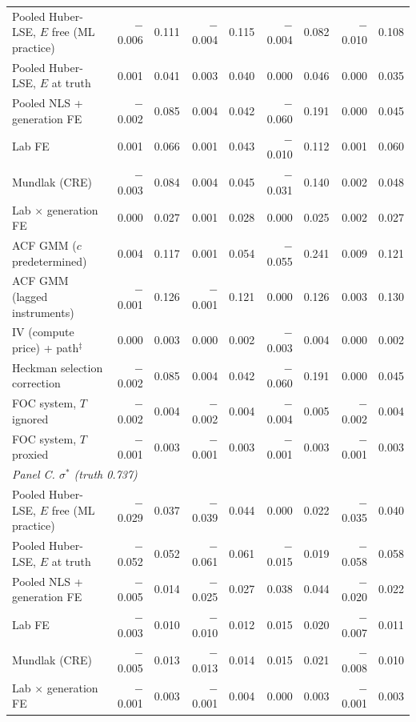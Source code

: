 \begin{table}[!htbp]
\begin{threeparttable}
\begin{tabular}{lrrrrrrrr}
Pooled Huber-LSE, $E$ free (ML practice) & $-$0.006 & 0.111 & $-$0.004 & 0.115 & $-$0.004 & 0.082 & $-$0.010 & 0.108 \\
Pooled Huber-LSE, $E$ at truth & 0.001 & 0.041 & 0.003 & 0.040 & 0.000 & 0.046 & 0.000 & 0.035 \\
Pooled NLS + generation FE & $-$0.002 & 0.085 & 0.004 & 0.042 & $-$0.060 & 0.191 & 0.000 & 0.045 \\
Lab FE & 0.001 & 0.066 & 0.001 & 0.043 & $-$0.010 & 0.112 & 0.001 & 0.060 \\
Mundlak (CRE) & $-$0.003 & 0.084 & 0.004 & 0.045 & $-$0.031 & 0.140 & 0.002 & 0.048 \\
Lab $\times$ generation FE & 0.000 & 0.027 & 0.001 & 0.028 & 0.000 & 0.025 & 0.002 & 0.027 \\
ACF GMM ($c$ predetermined) & 0.004 & 0.117 & 0.001 & 0.054 & $-$0.055 & 0.241 & 0.009 & 0.121 \\
ACF GMM (lagged instruments) & $-$0.001 & 0.126 & $-$0.001 & 0.121 & 0.000 & 0.126 & 0.003 & 0.130 \\
IV (compute price) + path$^{\ddagger}$ & 0.000 & 0.003 & 0.000 & 0.002 & $-$0.003 & 0.004 & 0.000 & 0.002 \\
Heckman selection correction & $-$0.002 & 0.085 & 0.004 & 0.042 & $-$0.060 & 0.191 & 0.000 & 0.045 \\
FOC system, $T$ ignored & $-$0.002 & 0.004 & $-$0.002 & 0.004 & $-$0.004 & 0.005 & $-$0.002 & 0.004 \\
FOC system, $T$ proxied & $-$0.001 & 0.003 & $-$0.001 & 0.003 & $-$0.001 & 0.003 & $-$0.001 & 0.003 \\
\midrule
\multicolumn{9}{l}{\textit{Panel C. $\sigma^*$ (truth 0.737)}} \\
Pooled Huber-LSE, $E$ free (ML practice) & $-$0.029 & 0.037 & $-$0.039 & 0.044 & 0.000 & 0.022 & $-$0.035 & 0.040 \\
Pooled Huber-LSE, $E$ at truth & $-$0.052 & 0.052 & $-$0.061 & 0.061 & $-$0.015 & 0.019 & $-$0.058 & 0.058 \\
Pooled NLS + generation FE & $-$0.005 & 0.014 & $-$0.025 & 0.027 & 0.038 & 0.044 & $-$0.020 & 0.022 \\
Lab FE & $-$0.003 & 0.010 & $-$0.010 & 0.012 & 0.015 & 0.020 & $-$0.007 & 0.011 \\
Mundlak (CRE) & $-$0.005 & 0.013 & $-$0.013 & 0.014 & 0.015 & 0.021 & $-$0.008 & 0.010 \\
Lab $\times$ generation FE & $-$0.001 & 0.003 & $-$0.001 & 0.004 & 0.000 & 0.003 & $-$0.001 & 0.003 \\

\end{tabular}
\end{threeparttable}
\end{table}
